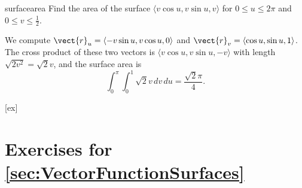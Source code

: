 \begin{example}{}{surfacearea}
Find the area of the surface $\langle v\cos u,v\sin
u,v\rangle$ for $0\le u \le 2\pi$ and  $0\le v\le \frac{1}{2}$.
\end{example}

\begin{solution}
We compute $\vect{r}_u = \langle -v\sin u,v\cos u,0\rangle$
and $\vect{r}_v = \langle \cos u,\sin u,1\rangle$.
The cross product of these two vectors is $\langle v \cos u,v\sin
u,-v\rangle$ with length $\sqrt{2v^2}=\sqrt{2}v$, and the surface area is
$$\int_0^\pi\int_0^1 \sqrt{2}v\,dv\,du=\frac{\sqrt{2}\pi}{4}.$$
\end{solution}


[ex]
\section*{Exercises for \ref{sec:VectorFunctionSurfaces}}

